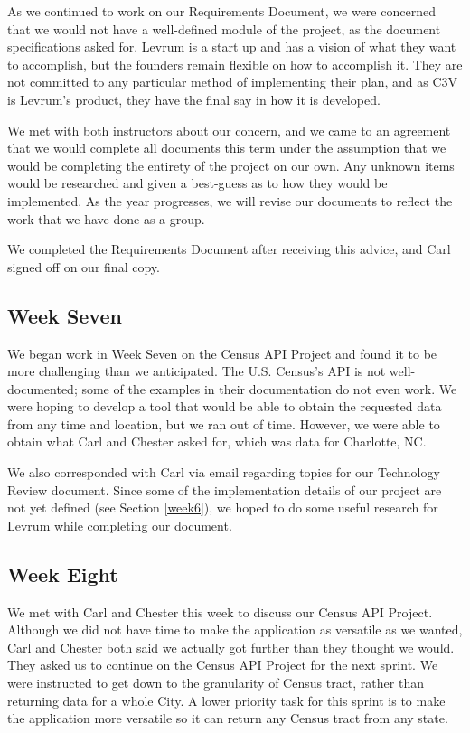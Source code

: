 \documentclass[onecolumn, draftclsnofoot,10pt, compsoc]{IEEEtran}
\begin{document}
\begin{singlespace}
As we continued to work on our Requirements Document, we were concerned that we would not have a well-defined module of the project, as the document specifications asked for.
Levrum is a start up and has a vision of what they want to accomplish, but the founders remain flexible on how to accomplish it.
They are not committed to any particular method of implementing their plan, and as C3V is Levrum's product, they have the final say in how it is developed.

We met with both instructors about our concern, and we came to an agreement that we would complete all documents this term under the assumption that we would be completing the entirety of the project on our own.
Any unknown items would be researched and given a best-guess as to how they would be implemented.
As the year progresses, we will revise our documents to reflect the work that we have done as a group.

We completed the Requirements Document after receiving this advice, and Carl signed off on our final copy.

\subsection{Week Seven}
We began work in Week Seven on the Census API Project and found it to be more challenging than we anticipated.
The U.S. Census's API is not well-documented;
some of the examples in their documentation do not even work.
We were hoping to develop a tool that would be able to obtain the requested data from any time and location, but we ran out of time.
However, we were able to obtain what Carl and Chester asked for, which was data for Charlotte, NC.

We also corresponded with Carl via email regarding topics for our Technology Review document.
Since some of the implementation details of our project are not yet defined (see Section \ref{week6}), we hoped to do some useful research for Levrum while completing our document.

\subsection{Week Eight}
We met with Carl and Chester this week to discuss our Census API Project. 
Although we did not have time to make the application as versatile as we wanted, Carl and Chester both said we actually got further than they thought we would.
They asked us to continue on the Census API Project for the next sprint.
We were instructed to get down to the granularity of Census tract, rather than returning data for a whole City. 
A lower priority task for this sprint is to make the application more versatile so it can return any Census tract from any state.


\end{singlespace}
\end{document}
